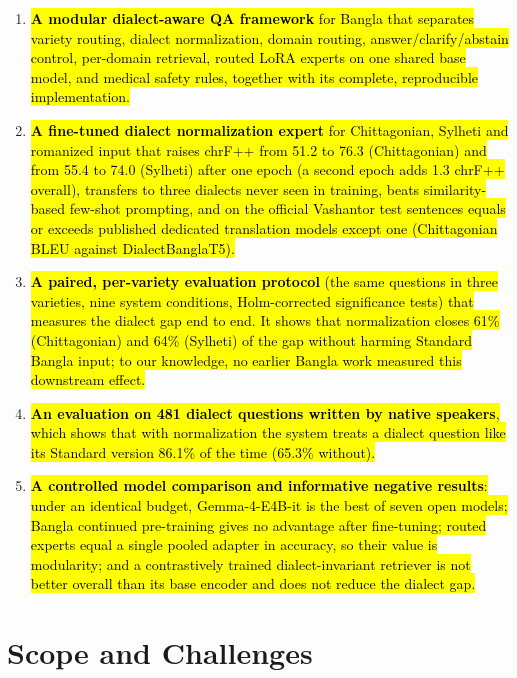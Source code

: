 \begin{enumerate}
\item \hl{\textbf{A modular dialect-aware QA framework} for Bangla that
separates variety routing, dialect normalization, domain routing,
answer/clarify/abstain control, per-domain retrieval, routed LoRA
experts on one shared base model, and medical safety rules, together
with its complete, reproducible implementation.}

\item \hl{\textbf{A fine-tuned dialect normalization expert} for
Chittagonian, Sylheti and romanized input that raises chrF++ from 51.2
to 76.3 (Chittagonian) and from 55.4 to 74.0 (Sylheti) after one epoch
(a second epoch adds 1.3 chrF++ overall), transfers to three dialects
never seen in training, beats similarity-based few-shot prompting, and
on the official Vashantor test sentences equals or exceeds published
dedicated translation models except one (Chittagonian BLEU against
DialectBanglaT5).}

\item \hl{\textbf{A paired, per-variety evaluation protocol} (the same
questions in three varieties, nine system conditions, Holm-corrected
significance tests) that measures the dialect gap end to end. It shows
that normalization closes 61\% (Chittagonian) and 64\% (Sylheti) of the
gap without harming Standard Bangla input; to our knowledge, no earlier
Bangla work measured this downstream effect.}

\item \hl{\textbf{An evaluation on 481 dialect questions written by native
speakers}, which shows that with normalization the system treats a
dialect question like its Standard version 86.1\% of the time (65.3\%
without).}

\item \hl{\textbf{A controlled model comparison and informative negative
results}: under an identical budget, Gemma-4-E4B-it is the best of seven
open models; Bangla continued pre-training gives no advantage after
fine-tuning; routed experts equal a single pooled adapter in accuracy,
so their value is modularity; and a contrastively trained
dialect-invariant retriever is not better overall than its base encoder
and does not reduce the dialect gap.}
\end{enumerate}

\section{Scope and Challenges}\label{scope-and-challenges}

